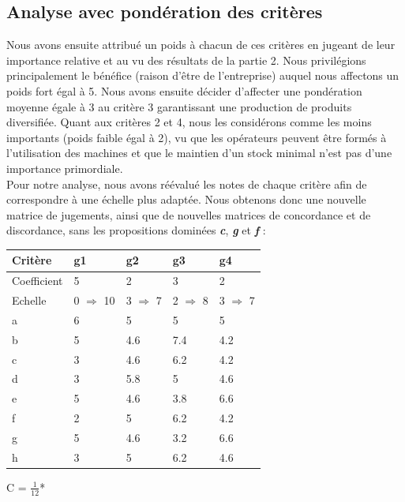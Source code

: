 \documentclass[12pt]{article}
\begin{document}
\subsection{Analyse avec pondération des critères} 
Nous avons ensuite attribué un poids à chacun de ces critères en jugeant de leur importance relative et au vu des résultats de la partie 2. Nous privilégions principalement le bénéfice (raison d'être de l'entreprise) auquel nous affectons un poids fort égal à 5. Nous avons ensuite décider d'affecter une pondération moyenne égale à 3 au critère 3 garantissant une production de produits diversifiée. Quant aux critères 2 et 4, nous les considérons comme les moins importants (poids faible égal à 2), vu que les opérateurs peuvent être formés à l'utilisation des machines et que le maintien d'un stock minimal n'est pas d'une importance primordiale.\\
Pour notre analyse, nous avons réévalué les notes de chaque critère afin de correspondre à une échelle plus adaptée. Nous obtenons donc une nouvelle matrice de jugements, ainsi que de nouvelles matrices de concordance et de discordance, sans les propositions dominées \textbf{\emph{c}}, \textbf{\emph{g}} et \textbf{\emph{f}} :
\begin{center}
\renewcommand{\arraystretch}{1.2}
\begin{tabular}{|L|M|M|M|M|}
\hline 
Critère & g1 & g2 & g3 & g4 \\\hline  
Coefficient & 5 & 2 & 3 & 2 \\ \hline 
Echelle & 0 $ \Rightarrow $ 10 & 3 $ \Rightarrow $ 7 & 2 $ \Rightarrow $ 8 & 3 $ \Rightarrow $ 7 \\ \hline 
a & 6 & 5 & 5 & 5 \\ \hline 
b & 5 & 4.6 & 7.4 & 4.2 \\ \hline 
c & 3 & 4.6 & 6.2 & 4.2 \\ \hline 
d & 3 & 5.8 & 5 & 4.6 \\ \hline 
e & 5 & 4.6 & 3.8 & 6.6 \\ \hline 
f & 2 & 5 & 6.2 & 4.2 \\ \hline 
g & 5 & 4.6 & 3.2 & 6.6 \\ \hline 
h & 3 & 5 & 6.2 & 4.6 \\ 
\hline 
\end{tabular} 
\end{center}
\begin{minipage}{0.45\textwidth}
C = $\frac{1}{12}$*
\end{minipage}
\end{document}
